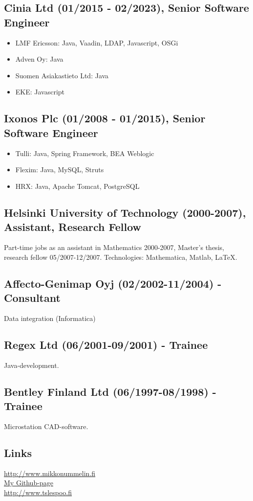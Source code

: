 \documentclass[a4paper,12pt]{article}
\begin{document}
\subsection*{Cinia Ltd (01/2015 - 02/2023), Senior Software Engineer}
\begin{itemize}
\item{LMF Ericsson: Java, Vaadin, LDAP, Javascript, OSGi}
\item{Adven Oy: Java}
\item{Suomen Asiakastieto Ltd: Java}
\item{EKE: Javascript}
\end{itemize}
\subsection*{Ixonos Plc (01/2008 - 01/2015), Senior Software Engineer}
\begin{itemize}
\item{Tulli: Java, Spring Framework, BEA Weblogic}
\item{Flexim: Java, MySQL, Struts}
\item{HRX: Java, Apache Tomcat, PostgreSQL}
\end{itemize}
\subsection*{Helsinki University of Technology (2000-2007), Assistant, Research Fellow}
Part-time jobs as an assistant in Mathematics 2000-2007, Master's thesis, research fellow 05/2007-12/2007. Technologies: Mathematica, Matlab, LaTeX.
\subsection*{Affecto-Genimap Oyj (02/2002-11/2004) - Consultant}
Data integration (Informatica)
\subsection*{Regex Ltd (06/2001-09/2001) - Trainee}
Java-development.
\subsection*{Bentley Finland Ltd (06/1997-08/1998) - Trainee}
Microstation CAD-software.
\subsection*{Links}
\href{http://www.mikkonummelin.fi}{http://www.mikkonummelin.fi} \\
\href{http://github.com/mnummeli}{My Github-page} \\
\href{http://www.tslespoo.fi}{http://www.tslespoo.fi}
\end{document}
